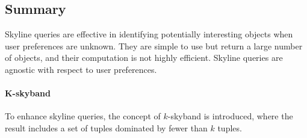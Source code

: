 \subsection{Summary}
Skyline queries are effective in identifying potentially interesting objects when user preferences are unknown. 
They are simple to use but return a large number of objects, and their computation is not highly efficient. 
Skyline queries are agnostic with respect to user preferences.

\paragraph*{K-skyband} 
To enhance skyline queries, the concept of $k$-skyband is introduced, where the result includes a set of tuples dominated by fewer than $k$ tuples.